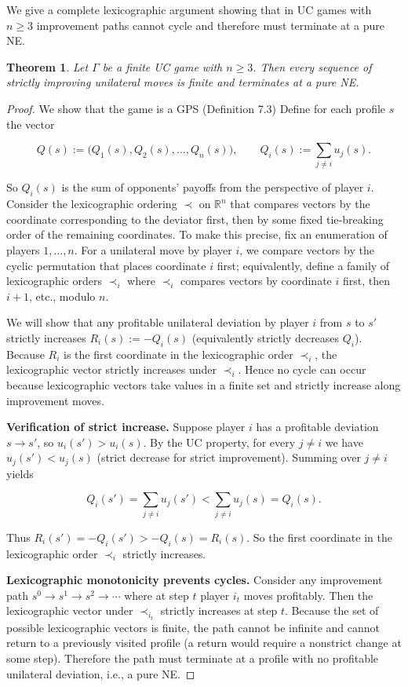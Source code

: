 \documentclass[11pt]{article}
\newtheorem{theorem}{Theorem}[section]
\begin{document}
We give a complete lexicographic argument showing that in UC games with
\(n\ge3\) improvement paths cannot cycle and therefore must terminate at a
pure NE.

\begin{theorem}
Let \(\Gamma\) be a finite UC game with \(n\ge3\). Then every sequence of
strictly improving unilateral moves is finite and terminates at a pure NE.
\end{theorem}

\begin{proof}
We show that the game is a GPS (Definition 7.3) Define for each profile \(s\) the vector


\[
Q(s) := \big(Q_1(s),Q_2(s),\dots,Q_n(s)\big),\qquad Q_i(s):=\sum_{j\ne i} u_j(s).
\]


So \(Q_i(s)\) is the sum of opponents' payoffs from the perspective of
player \(i\). Consider the lexicographic ordering \(\prec\) on \(\mathbb R^n\)
that compares vectors by the coordinate corresponding to the deviator first,
then by some fixed tie‑breaking order of the remaining coordinates. To make
this precise, fix an enumeration of players \(1,\dots,n\). For a unilateral
move by player \(i\), we compare vectors by the cyclic permutation that
places coordinate \(i\) first; equivalently, define a family of lexicographic
orders \(\prec_i\) where \(\prec_i\) compares vectors by coordinate \(i\)
first, then \(i+1\), etc., modulo \(n\).

We will show that any profitable unilateral deviation by player \(i\) from
\(s\) to \(s'\) strictly increases \(R_i(s):=-Q_i(s)\) (equivalently strictly
decreases \(Q_i\)). Because \(R_i\) is the first coordinate in the lexicographic
order \(\prec_i\), the lexicographic vector strictly increases under \(\prec_i\).
Hence no cycle can occur because lexicographic vectors take values in a
finite set and strictly increase along improvement moves.

\textbf{Verification of strict increase.} Suppose player \(i\) has a
profitable deviation \(s\to s'\), so \(u_i(s')>u_i(s)\). By the UC property,
for every \(j\ne i\) we have \(u_j(s')<u_j(s)\) (strict decrease for strict
improvement). Summing over \(j\ne i\) yields


\[
Q_i(s') = \sum_{j\ne i} u_j(s') < \sum_{j\ne i} u_j(s) = Q_i(s).
\]


Thus \(R_i(s')=-Q_i(s') > -Q_i(s) = R_i(s)\). So the first coordinate in the
lexicographic order \(\prec_i\) strictly increases.

\textbf{Lexicographic monotonicity prevents cycles.} Consider any improvement
path \(s^0\to s^1\to s^2\to\cdots\) where at step \(t\) player \(i_t\) moves
profitably. Then the lexicographic vector under \(\prec_{i_t}\) strictly
increases at step \(t\). Because the set of possible lexicographic vectors
is finite, the path cannot be infinite and cannot return to a previously
visited profile (a return would require a nonstrict change at some step).
Therefore the path must terminate at a profile with no profitable unilateral
deviation, i.e., a pure NE.


\end{proof}
\end{document}
